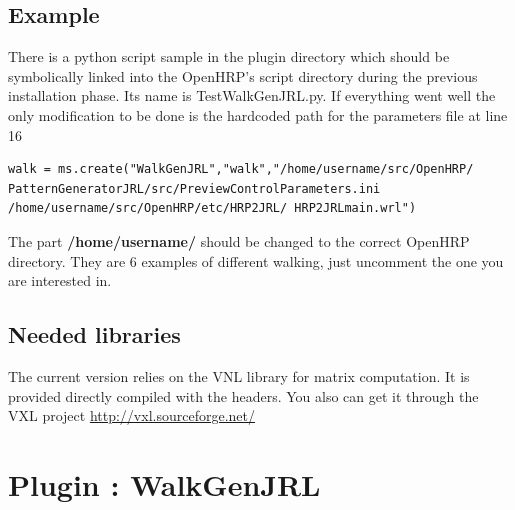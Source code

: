 \subsection{Example}
There is a python script sample in the plugin directory which should be symbolically linked into the OpenHRP's
script directory during the previous installation phase. Its name is TestWalkGenJRL.py.
If everything went well the only modification to be done is the hardcoded path for
the parameters file at line 16
\begin{verbatim}
walk = ms.create("WalkGenJRL","walk","/home/username/src/OpenHRP/
PatternGeneratorJRL/src/PreviewControlParameters.ini
/home/username/src/OpenHRP/etc/HRP2JRL/ HRP2JRLmain.wrl")
\end{verbatim}
The part
{\bf /home/username/ }
should be changed to the correct OpenHRP directory.
They are 6 examples of different walking, just uncomment the one you are interested in.

\subsection{Needed libraries}
The current version relies on the VNL library for matrix computation. It is provided directly compiled with the headers.
You also can get it through the VXL project
\href{http://vxl.sourceforge.net/}{http://vxl.sourceforge.net/}

\section{Plugin : WalkGenJRL}

